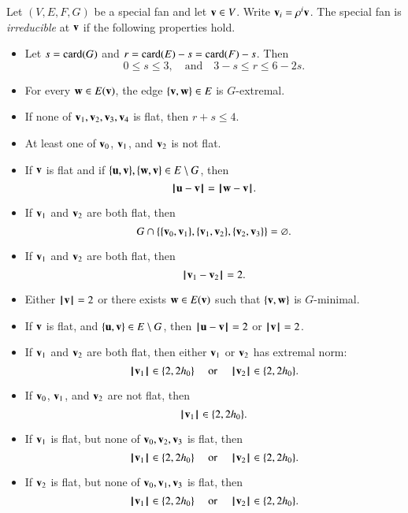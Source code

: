 \begin{definition}[irreducible]  Let $(V,E,F,G)$ be a special fan and let $\v\in V$.  
Write $\v_i  = \rho^i \v$.
The special fan is {\it irreducible} at $\v$
if the following properties hold. 
\begin{itemize}
\item {} %
 Let      $s=\card(G)$ and $r=\card(E) - s = \card(F)-s$.  Then
$$0\le s \le 3,\quad\text{and}\quad3-s \le r \le 6 - 2s.$$
\item {} For every $\w\in E(\v)$,  the edge $\{\v,\w\}\in E$ is $G$-extremal.
\item {}  If none of $\v_1,\v_2,\v_3,\v_4$ is flat, then $r+s\le 4$. 
\item {} At least one of $\v_0$, $\v_1$, and $\v_2$ is not flat.
\item {} If $\v$ is flat and if $\{\u,\v\},\{\w,\v\}\in E\setminus G$, then
$$
\norm{\u}{\v} = \norm{\w}{\v}.
$$
\item {} If $\v_1$ and $\v_2$ are both flat, then 
$$G\cap \{\{\v_0,\v_1\},\{\v_1,\v_2\},\{\v_2,\v_3\}\} = \emptyset.$$
\item {} If $\v_1$ and $\v_2$ are both flat, then
$$
\norm{\v_1}{\v_2} = 2.
$$
\item {} Either $\normo{\v}=2$ or there exists $\w\in E(\v)$ such
that $\{\v,\w\}$ is $G$-minimal.
\item {} If $\v$ is flat, and $\{\u,\v\}\in E\setminus G$, then
$\norm{\u}{\v}=2$ or $\normo{\v}=2$.
\item {} If $\v_1$ and $\v_2$ are both flat, then either $\v_1$ or $\v_2$
has extremal norm:
$$\normo{\v_1}\in \{2,2\hm\}\quad\text{ or }\quad \normo{\v_2}\in \{2,2\hm\}.$$
\item {}  If $\v_0$, $\v_1$, and $\v_2$ are not flat, then
$$
\normo{\v_1}\in \{2,2\hm\}.
$$
\item {}  If $\v_1$ is flat, but none of $\v_0,\v_2,\v_3$ is flat, then
$$
\normo{\v_1}\in \{2,2\hm\}\quad\text{ or }\quad\normo{\v_2}\in \{2,2\hm\}.
$$
\item {}  If $\v_2$ is flat, but none of $\v_0,\v_1,\v_3$ is flat, then
$$
\normo{\v_1}\in \{2,2\hm\}\quad\text{ or }\quad\normo{\v_2}\in \{2,2\hm\}.
$$
\end{itemize}
\end{definition}



